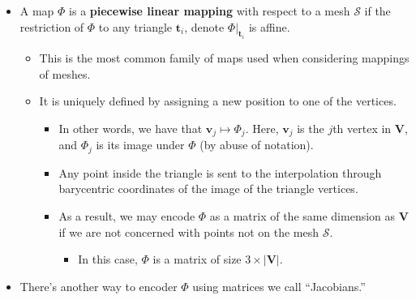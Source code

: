 \documentclass[10pt]{article}
\newcommand{\ve}[1]{\mathbf{#1}}
\newcommand{\mcal}[1]{\mathcal{#1}}
\begin{document}
\begin{itemize}
    \item A map $\Phi$ is a {\bf piecewise linear mapping} with respect to a mesh $\mcal{S}$ if the restriction of $\Phi$ to any triangle $\ve{t}_i$, denote $\Phi|_{\ve{t}_i}$ is affine.
    \begin{itemize}
        \item This is the most common family of maps used when considering mappings of meshes.
        \item It is uniquely defined by assigning a new position to one of the vertices.
        \begin{itemize}
            \item In other words, we have that $\ve{v}_j \mapsto \Phi_j$. Here, $\ve{v}_j$ is the $j$th vertex in $\ve{V}$, and $\Phi_j$ is its image under $\Phi$ (by abuse of notation).
            
            \item Any point inside the triangle is sent to the interpolation through barycentric coordinates of the image of the triangle vertices.            
            
            \item As a result, we may encode $\Phi$ as a matrix of the same dimension as $\ve{V}$ if we are not concerned with points not on the mesh $\mcal{S}$.
            \begin{itemize}
                \item In this case, $\Phi$ is a matrix of size $3 \times |\ve{V}|$.
            \end{itemize}
        \end{itemize}        
    \end{itemize}
    
    \item There's another way to encoder $\Phi$ using matrices we call ``Jacobians.''
    

\end{itemize}
\end{document}
